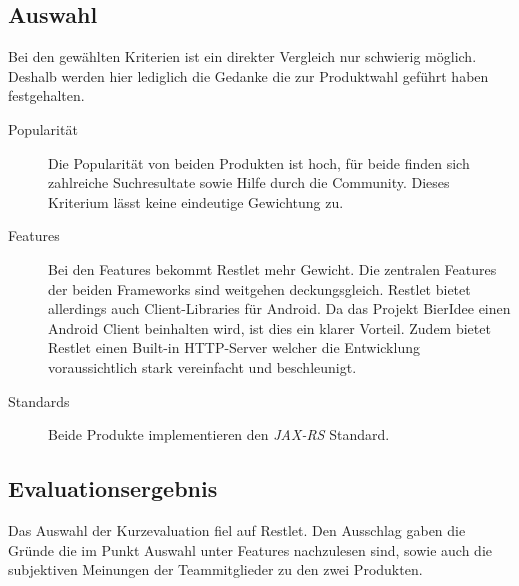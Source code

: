 \documentclass[10pt,a4paper]{scrartcl}
\begin{document}
\subsection{Auswahl}
Bei den gewählten Kriterien ist ein direkter Vergleich nur schwierig möglich. Deshalb werden hier lediglich die Gedanke die zur Produktwahl geführt haben festgehalten.

\begin{description}
	\item[Popularität]Die Popularität von beiden Produkten ist hoch, für beide finden sich zahlreiche Suchresultate sowie Hilfe durch die Community. Dieses Kriterium lässt keine eindeutige Gewichtung zu.
	\item[Features]Bei den Features bekommt Restlet mehr Gewicht. Die zentralen Features der beiden Frameworks sind weitgehen deckungsgleich. Restlet bietet allerdings auch Client-Libraries für Android. Da das Projekt BierIdee einen Android Client beinhalten wird, ist dies ein klarer Vorteil. Zudem bietet Restlet einen Built-in HTTP-Server welcher die Entwicklung voraussichtlich stark vereinfacht und beschleunigt.
	\item[Standards]Beide Produkte implementieren den \textit{JAX-RS} Standard.
\end{description}

\subsection{Evaluationsergebnis}
Das Auswahl der Kurzevaluation fiel auf Restlet. Den Ausschlag gaben die Gründe die im Punkt Auswahl unter Features nachzulesen sind, sowie auch die subjektiven Meinungen der Teammitglieder zu den zwei Produkten.
\end{document}
